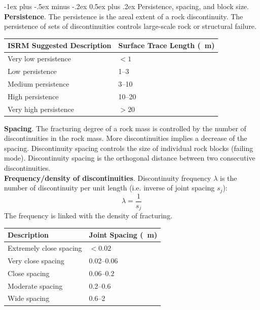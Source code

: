 \documentclass[10pt,landscape,a4paper]{article}
\makeatletter
\renewcommand{\section}{\@startsection{section}{1}{0mm}%
	{-1ex plus -.5ex minus -.2ex}%
	{0.5ex plus .2ex}%
	{\normalfont\large\bfseries}}
\makeatother
\begin{document}
\begin{multicols}{3}
		\section{Persistence, spacing, and block size.}
		\textbf{Persistence}.
		The persistence is the areal extent of a rock discontinuity.
		The persistence of sets of discontinuities controls large-scale rock or structural failure.
			\begin{table}[H]\scriptsize\centering\begin{tabular}{ll}
				ISRM Suggested Description & Surface Trace Length (\SI{}{\meter})\\
				\hline
				Very low persistence & $<1$\\
				Low persistence & \SIrange{1}{3}{}\\
				Medium persistence & \SIrange{3}{10}{}\\
				High persistence & \SIrange{10}{20}{}\\
				Very high persistence & $>20$\\
			\end{tabular}\end{table}
		\textbf{Spacing}.
		The fracturing degree of a rock mass is controlled by the number of discontinuities in the rock mass.
		More discontinuities implies a decrease of the spacing.
		Discontinuity spacing controls the size of individual rock blocks (failing mode).
		Discontinuity spacing is the orthogonal distance between two consecutive discontinuities.\\
		\textbf{Frequency/density of discontinuities}.
		Discontinuity frequency $\lambda$ is the number of discontinuity per unit length (i.e. inverse of joint spacing $s_j$):
		\[
			\lambda=\frac{1}{s_j}
		\]
		The frequency is linked with the density of fracturing.
			\begin{table}[H]\scriptsize\centering\begin{tabular}{ll}
				Description & Joint Spacing (\SI{}{\meter})\\
				\hline
				Extremely close spacing & $<0.02$\\
				Very close spacing & \SIrange{0.02}{0.06}{}\\
				Close spacing & \SIrange{0.06}{0.2}{}\\
				Moderate spacing & \SIrange{0.2}{0.6}{}\\
				Wide spacing & \SIrange{0.6}{2}{}\\

\end{tabular}
\end{table}
\end{multicols}
\end{document}
